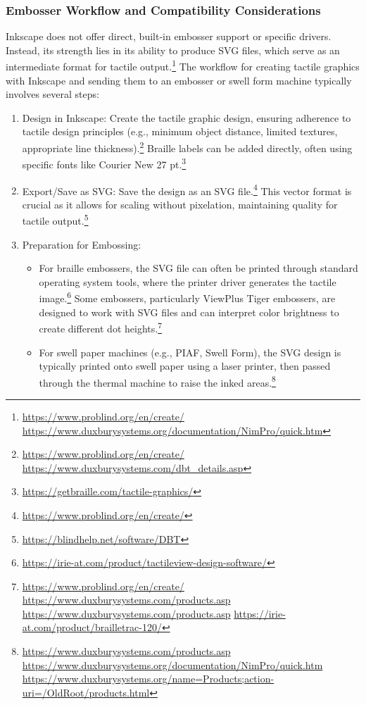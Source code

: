 \subsubsection{Embosser Workflow and Compatibility Considerations}

Inkscape does not offer direct, built-in embosser support or specific drivers. Instead, its strength lies in its ability to produce SVG files, which serve as an intermediate format for tactile output.\footnote{\url{https://www.problind.org/en/create/} \url{https://www.duxburysystems.org/documentation/NimPro/quick.htm}} The workflow for creating tactile graphics with Inkscape and sending them to an embosser or swell form machine typically involves several steps:

\begin{enumerate}
    \item Design in Inkscape: Create the tactile graphic design, ensuring adherence to tactile design principles (e.g., minimum object distance, limited textures, appropriate line thickness).\footnote{\url{https://www.problind.org/en/create/} \url{https://www.duxburysystems.com/dbt_details.asp}} Braille labels can be added directly, often using specific fonts like Courier New 27 pt.\footnote{\url{https://getbraille.com/tactile-graphics/}}
    \item Export/Save as SVG: Save the design as an SVG file.\footnote{\url{https://www.problind.org/en/create/}} This vector format is crucial as it allows for scaling without pixelation, maintaining quality for tactile output.\footnote{\url{https://blindhelp.net/software/DBT}}
    \item Preparation for Embossing:
    \begin{itemize}
        \item For braille embossers, the SVG file can often be printed through standard operating system tools, where the printer driver generates the tactile image.\footnote{\url{https://irie-at.com/product/tactileview-design-software/}} Some embossers, particularly ViewPlus Tiger embossers, are designed to work with SVG files and can interpret color brightness to create different dot heights.\footnote{\url{https://www.problind.org/en/create/} \url{https://www.duxburysystems.com/products.asp} \url{https://www.duxburysystems.com/products.asp} \url{https://irie-at.com/product/brailletrac-120/}}
        \item For swell paper machines (e.g., PIAF, Swell Form), the SVG design is typically printed onto swell paper using a laser printer, then passed through the thermal machine to raise the inked areas.\footnote{\url{https://www.duxburysystems.com/products.asp} \url{https://www.duxburysystems.org/documentation/NimPro/quick.htm} \url{https://www.duxburysystems.org/name=Products;action-uri=/OldRoot/products.html}}

\end{itemize}
\end{enumerate}
